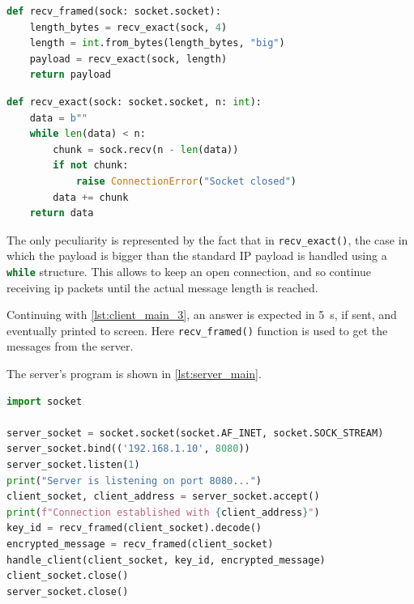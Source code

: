 \begin{lstlisting}[basicstyle=\ttfamily\footnotesize,language=python, caption=Function reading a custom frame using its header to determine the content's length., label=lst:recv_framed, float=h]
def recv_framed(sock: socket.socket):
    length_bytes = recv_exact(sock, 4)
    length = int.from_bytes(length_bytes, "big")
    payload = recv_exact(sock, length)
    return payload
\end{lstlisting}

\begin{lstlisting}[basicstyle=\ttfamily\footnotesize, language=python, caption= Function reading a given number of IP protocol packets., label=lst:recv_exact, float=h]
def recv_exact(sock: socket.socket, n: int):
    data = b""
    while len(data) < n:
        chunk = sock.recv(n - len(data))
        if not chunk:
            raise ConnectionError("Socket closed")
        data += chunk
    return data
\end{lstlisting}

The only peculiarity is represented by the fact that in
\lstinline[language=python]|recv_exact()|, the case in which the
payload is bigger than the
standard IP payload is handled using a
\lstinline[language=python]|while| structure.
This allows to keep an open connection, and so continue receiving ip
packets until the
actual message length is reached.

Continuing with \cref{lst:client_main_3}, an answer is expected in
\SI{5}{\second}, if sent, and eventually
printed to screen. Here \lstinline[language=python]|recv_framed()|
function is used to get the messages from the server.

The server's program is shown in \cref{lst:server_main}.

\begin{lstlisting}[basicstyle=\ttfamily\footnotesize, language=python, caption=Server's script., label=lst:server_main, float=h]
import socket

server_socket = socket.socket(socket.AF_INET, socket.SOCK_STREAM)
server_socket.bind(('192.168.1.10', 8080))
server_socket.listen(1)
print("Server is listening on port 8080...")
client_socket, client_address = server_socket.accept()
print(f"Connection established with {client_address}")
key_id = recv_framed(client_socket).decode()
encrypted_message = recv_framed(client_socket)
handle_client(client_socket, key_id, encrypted_message)
client_socket.close()
server_socket.close()
\end{lstlisting}

